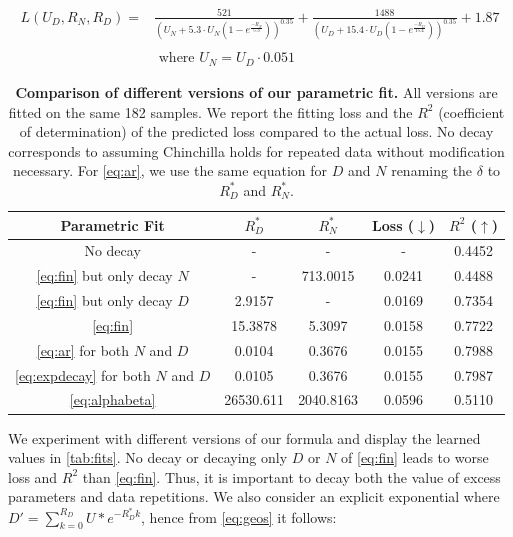 \documentclass{article}
\begin{document}
\begin{equation}\label{eq:finvals}
\begin{aligned}
L(U_D,R_N,R_D)=&\frac{521}{(U_N + 5.3 \cdot U_N (1 - e^{\frac{-R_N}{5.3}}))^{0.35}} + \frac{1488}{(U_D + 15.4 \cdot U_D (1 - e^{\frac{-R_D}{15.4}}))^{0.35}} + 1.87\\ \\
& \text{ where } U_N = U_D \cdot 0.051
\end{aligned}
\end{equation}


\begin{table}[htbp]
\centering
\caption{\textbf{Comparison of different versions of our parametric fit.} All versions are fitted on the same 182 samples. We report the fitting loss and the $R^2$ (coefficient of determination) of the predicted loss compared to the actual loss. No decay corresponds to assuming Chinchilla holds for repeated data without modification necessary. For \autoref{eq:ar}, we use the same equation for $D$ and $N$ renaming the $\delta$ to $R_D^*$ and $R_N^*$.}
\begin{tabular}{c | c c | c c}
\toprule
Parametric Fit & $R_D^*$ & $R_N^*$ & Loss ($\downarrow$) & $R^2$ ($\uparrow$) \\
\midrule
No decay & - & - & - & 0.4452 \\
\autoref{eq:fin} but only decay $N$ & - & 713.0015 & 0.0241 & 0.4488 \\
\autoref{eq:fin} but only decay $D$ & 2.9157 & - & 0.0169 & 0.7354 \\
\autoref{eq:fin} & 15.3878 & 5.3097 & 0.0158 & 0.7722 \\
\autoref{eq:ar} for both $N$ and $D$ & 0.0104 & 0.3676 & 0.0155 & 0.7988 \\
\autoref{eq:expdecay} for both $N$ and $D$ & 0.0105 & 0.3676 &  0.0155 & 0.7987 \\
\autoref{eq:alphabeta} & 26530.611 & 2040.8163 & 0.0596 & 0.5110 \\
\bottomrule
\end{tabular}
\label{tab:fits}
\end{table}


We experiment with different versions of our formula and display the learned values in \autoref{tab:fits}. No decay or decaying only $D$ or $N$ of \autoref{eq:fin} leads to worse loss and $R^2$ than \autoref{eq:fin}. Thus, it is important to decay both the value of excess parameters and data repetitions. We also consider an explicit exponential where $D'=\sum_{k=0}^{R_D} U*e^{-R_D^*k}$, hence from \autoref{eq:geos} it follows:
\end{document}
